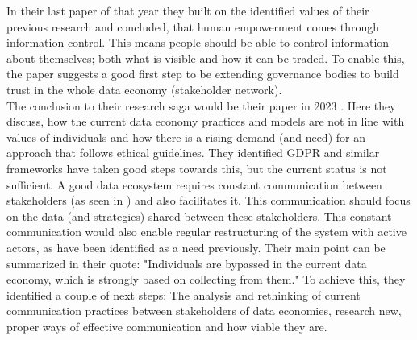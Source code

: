 \documentclass[english, 12pt, a4paper, sci, utf8, a-2b, online]{aaltothesis}
\theoremstyle{change}
\theoremstyle{theoremstyle}
\begin{document}
In their last paper of that year \cite{rantanen2020respecting} they built on the  identified values of their previous research and concluded, that human empowerment comes through information control. This means people should be able to control information about themselves; both what is visible and how it can be traded. To enable this, the paper suggests a good first step to be extending governance bodies to build trust in the whole data economy (stakeholder network).\\  
The conclusion to their research saga would be their paper in 2023 \cite{koskinen2023ethical}. Here they discuss, how the current data economy practices and models are not in line with values of individuals and how there is a rising demand (and need) for an approach that follows ethical guidelines. They identified GDPR and similar frameworks have taken good steps towards this, but the current status is not sufficient. A good data ecosystem requires constant communication between stakeholders (as seen in \cite{rantanen2020humans}) and also facilitates it. This communication should focus on the data (and strategies) shared between these stakeholders. This constant communication would also enable regular restructuring of the system with active actors, as have been identified as a need previously. Their main point can be summarized in their quote: "Individuals are bypassed in the current data economy, which is strongly based on collecting from them." To achieve this, they identified a couple of next steps: The analysis and rethinking of current communication practices between stakeholders of data economies, research new, proper ways of effective communication and how viable they are.\\
\end{document}
